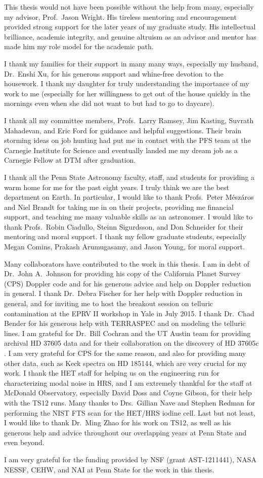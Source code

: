 This thesis would not have been possible without the help from many,
especially my advisor, Prof.\ Jason Wright. His tireless mentoring and
encouragement provided strong support for the later years of my
graduate study. His intellectual brilliance, academic integrity, and
genuine altruism as an advisor and mentor has made him my role model
for the academic path.

I thank my families for their support in many many ways, especially my
husband, Dr.\ Enshi Xu, for his generous support and whine-free
devotion to the housework. I thank my daughter for truly understanding
the importance of my work to me (especially for her willingness to get
out of the house quickly in the mornings even when she did not want to but
had to go to daycare). 

I thank all my committee members, Profs.\ Larry Ramsey, Jim Kasting,
Suvrath Mahadevan, and Eric Ford for guidance and helpful
suggestions. Their brain storming ideas on job hunting had put me in
contact with the PFS team at the Carnegie Institute for Science and
eventually landed me my dream job as a Carnegie Fellow at DTM after
graduation.

I thank all the Penn State Astronomy faculty, staff, and students for
providing a warm home for me for the past eight years. I truly think
we are the best department on Earth. In particular, I would like to
thank Profs.\ Peter M\'esz\'aros and Niel Brandt for taking me in on
their projects, providing me financial support, and teaching me many
valuable skills as an astronomer. I would like to thank Profs.\ Robin
Ciadullo, Steinn Sigurdsson, and Don Schneider for their mentoring and
moral support. I thank my fellow graduate students, especially Megan
Comins, Prakash Arumugasamy, and Jason Young, for moral support.

Many collaborators have contributed to the work in this thesis. I am
in debt of Dr.\ John A.\ Johnson for providing his copy of the
California Planet Survey (CPS) Doppler code and for his generous
advice and help on Doppler reduction in general. I thank Dr.\ Debra
Fischer for her help with Doppler reduction in general, and for
inviting me to host the breakout session on telluric contamination at
the EPRV II workshop in Yale in July 2015. I thank Dr.\ Chad Bender
for his generous help with TERRASPEC and on modeling the telluric
lines. I am grateful for Dr.\ Bill Cochran and the UT Austin team for
providing archival HD 37605 data and for their collaboration on the
discovery of HD 37605$c$. I am very grateful for CPS for the same
reason, and also for providing many other data, such as Keck spectra
on HD 185144, which are very crucial for my work. I thank the HET
staff for helping us on the engineering run for characterizing modal
noise in HRS, and I am extremely thankful for the staff at McDonald
Observatory, especially David Doss and Coyne Gibson, for their help
with the TS12 runs. Many thanks to Drs.\ Gillian Nave and Stephen
Redman for performing the NIST FTS scan for the HET/HRS iodine
cell. Last but not least, I would like to thank Dr.\ Ming Zhao for his
work on TS12, as well as his generous help and advice throughout our
overlapping years at Penn State and even beyond.

I am very grateful for the funding provided by NSF (grant AST-1211441),
NASA NESSF, CEHW, and NAI at Penn State for the work in this thesis.

